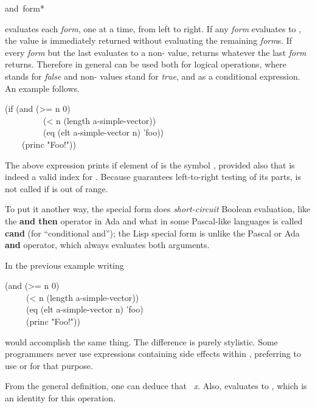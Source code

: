 \begin{defmac}
and {\,form}*

 evaluates each \emph{form}, one at a time,
from left to right.  If any \emph{form} evaluates to {\false}, the value {\nil}
is immediately returned without evaluating the remaining
\emph{form\/}s.  If every \emph{form} but the last evaluates to a non-{\false} value,
 returns whatever the last \emph{form} returns.
Therefore in general  can be used both for logical operations,
where {\false} stands for \emph{false} and non-{\false} values stand for \emph{true},
and as a conditional expression.
An example follows.
\begin{lisp}
(if (and (>= n 0) \\
~~~~~~~~~(< n (length a-simple-vector)) \\
~~~~~~~~~(eq (elt a-simple-vector n) 'foo)) \\
~~~~(princ "Foo!"))
\end{lisp}
The above expression prints  if element  of 
is the symbol , provided also that  is indeed a valid index
for .  Because  guarantees left-to-right testing
of its parts,  is not called if  is out of range.

To put it another way,
the  special form does \emph{short-circuit} Boolean evaluation,
like the \textbf{and then} operator in Ada
and what in some Pascal-like languages is called \textbf{cand} (for ``conditional
and''); the Lisp  special form is
unlike the Pascal or Ada \textbf{and} operator,
which always evaluates both arguments.

In the previous example writing
\begin{lisp}
(and (>= n 0) \\
~~~~~(< n (length a-simple-vector)) \\
~~~~~(eq (elt a-simple-vector n) 'foo) \\
~~~~~(princ "Foo!"))
\end{lisp}
would accomplish the same thing.  The difference is purely stylistic.
Some programmers never use expressions containing side effects
within , preferring to use  or  for that purpose.

From the general definition, one can deduce that
 \EQ\ \emph{x}.  Also,
 evaluates to {\true}, which is an identity for this operation.


\end{defmac}
